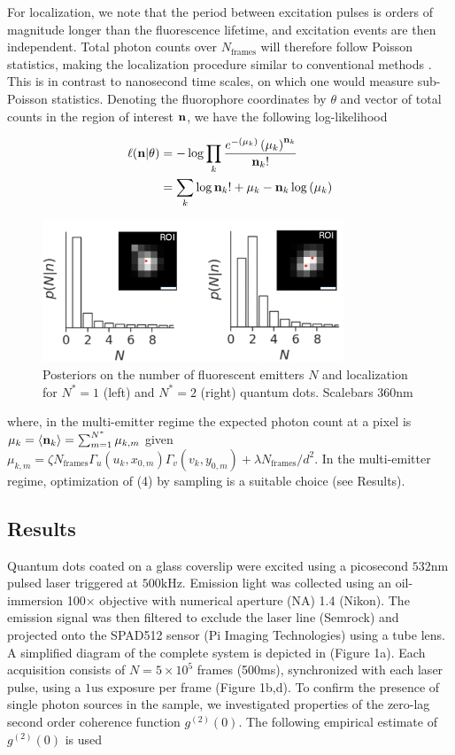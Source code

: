 \documentclass[a4paper, twocolumn, superscriptaddress,prl]{revtex4}  %
\begin{document}
For localization, we note that the period between excitation pulses is orders of magnitude longer than the fluorescence lifetime, and excitation events are then independent. Total photon counts over $N_{\mathrm{frames}}$ will therefore follow Poisson statistics, making the localization procedure similar to conventional methods \citep{Smith2010}. This is in contrast to nanosecond time scales, on which one would measure sub-Poisson statistics. Denoting the fluorophore coordinates by $\theta$ and vector of total counts in the region of interest $\bold{n}$, we have the following log-likelihood


\begin{align}
\ell(\bold{n}|\theta) &= -\log \prod_{k} \frac{e^{-\left(\mu_{k}\right)}\left(\mu_{k}\right)^{\bold{n}_k}}{\bold{n}_k!}\\
&= \sum_{k}  \log \bold{n}_k! + \mu_{k} - \bold{n}_k\log\left(\mu_{k}\right)
\end{align}

\begin{figure}
\includegraphics[width=9cm]{media/Figure-4.png}
\caption{Posteriors on the number of fluorescent emitters $N$ and localization for $N^{*}=1$ (left) and $N^{*}=2$ (right) quantum dots. Scalebars 360nm}
\end{figure}   

where, in the multi-emitter regime the expected photon count at a pixel is $\mu_{k} = \langle \bold{n}_k\rangle =\sum_{m=1}^{N^{*}} \mu_{k,m}$ given $\mu_{k,m}=\zeta N_{\mathrm{frames}}\Gamma_{u}(u_k,x_{0,m})\Gamma_{v}(v_k,y_{0,m}) + \lambda N_{\mathrm{frames}}/d^{2}$. In the multi-emitter regime, optimization of (4) by sampling is a suitable choice (see Results). 


\subsection{Results}

Quantum dots coated on a glass coverslip were excited using a picosecond $532\mathrm{nm}$ pulsed laser triggered at $500\mathrm{kHz}$. Emission light was collected using an oil-immersion 100$\times$ objective with numerical aperture (NA) 1.4 (Nikon). The emission signal was then filtered to exclude the laser line (Semrock) and projected onto the SPAD512 sensor (Pi Imaging Technologies) using a tube lens. A simplified diagram of the complete system is depicted in (Figure 1a). Each acquisition consists of $N=5\times 10^{5}$ frames (500ms), synchronized with each laser pulse, using a $1\mathrm{us}$ exposure per frame (Figure 1b,d). To confirm the presence of single photon sources in the sample, we investigated properties of the zero-lag second order coherence function $g^{(2)}(0)$. The following empirical estimate of $g^{(2)}(0)$ is used \citep{Israel2017}
\end{document}
